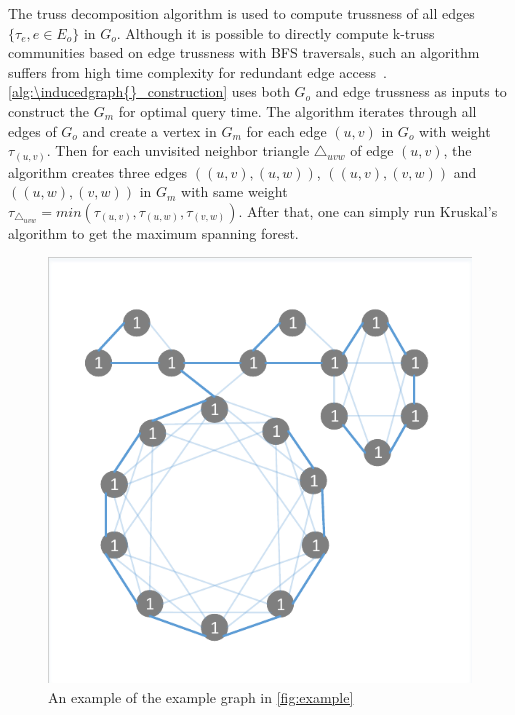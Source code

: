 The truss decomposition algorithm \cite{wang2012truss} is used to compute trussness of all edges $\{\tau_{e}, e \in E_{o}\}$ in $G_o$. Although it is possible to directly compute k-truss communities based on edge trussness with BFS traversals, such an algorithm suffers from high time complexity for redundant edge access~\cite{huang2014querying}. \autoref{alg:\inducedgraph{}_construction} uses both $G_o$ and edge trussness as inputs to construct the \inducedgraph{} $G_m$ for optimal query time. The algorithm iterates through all edges of $G_o$ and create a vertex in $G_m$ for each edge $(u,v)$ in $G_o$ with weight $\tau_{(u,v)}$. Then for each unvisited neighbor triangle $\triangle_{uvw}$ of edge $(u,v)$, the algorithm creates three edges $((u,v),(u,w))$, $((u,v),(v,w))$ and $((u,w),(v,w))$ in $G_m$ with same weight $\tau_{\triangle_{uvw}} = min(\tau_{(u,v)}, \tau_{(u,w)}, \tau_{(v,w)})$. After that, one can simply run Kruskal's algorithm to get the maximum spanning forest.

\begin{figure}[ht]
    \centering
    \includegraphics[width=\linewidth]{./figures/inducedgraph.pdf}
    \caption{An example \inducedgraph{} of the example graph in \autoref{fig:example}}
    \label{fig:\inducedgraph{}}
\end{figure}

